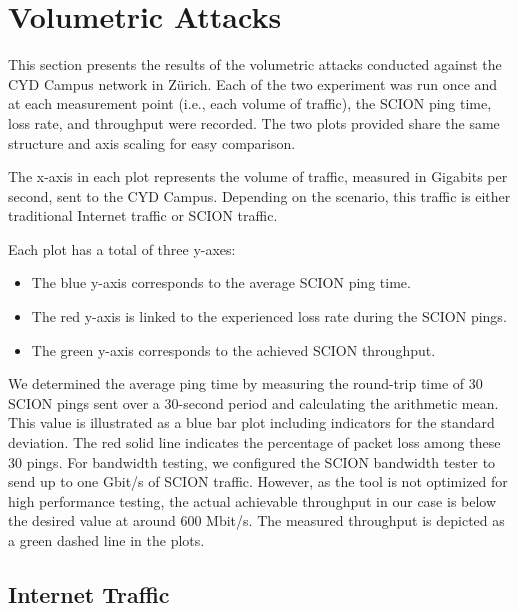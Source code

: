 \section{Volumetric Attacks}
\label{sec:volumetric-attacks}

This section presents the results of the volumetric attacks conducted against the CYD Campus network in Zürich.
Each of the two experiment was run once and at each measurement point (i.e., each volume of traffic), the SCION ping time, loss rate, and throughput were recorded.
The two plots provided share the same structure and axis scaling for easy comparison.

The x-axis in each plot represents the volume of traffic, measured in Gigabits per second, sent to the CYD Campus.
Depending on the scenario, this traffic is either traditional Internet traffic or SCION traffic.

Each plot has a total of three y-axes:
\begin{itemize}
    \item The blue y-axis corresponds to the average SCION ping time.
    \item The red y-axis is linked to the experienced loss rate during the SCION pings.
    \item The green y-axis corresponds to the achieved SCION throughput.
\end{itemize}

We determined the average ping time by measuring the round-trip time of 30 SCION pings sent over a 30-second period and calculating the arithmetic mean.
This value is illustrated as a blue bar plot including indicators for the standard deviation.
The red solid line indicates the percentage of packet loss among these 30 pings.
For bandwidth testing, we configured the SCION bandwidth tester to send up to one Gbit/s of SCION traffic.
However, as the tool is not optimized for high performance testing, the actual achievable throughput in our case is below the desired value at around 600 Mbit/s.
The measured throughput is depicted as a green dashed line in the plots.


\newpage

\subsection{Internet Traffic}

